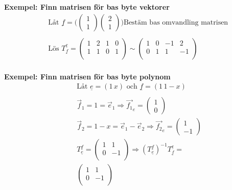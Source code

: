 \textbf{Exempel: Finn matrisen för bas byte vektorer} %
\begin{align*}
  &\quad  \text{Låt } \underline{f} =
  \Big( \begin{pmatrix} 1 \\ 1 \end{pmatrix} \begin{pmatrix} 2 \\ 1 \end{pmatrix} \Big)
  \text{Bestäm bas omvandling matrisen }   \\
  &\quad  \\
  &\quad  \text{Lös } T^{\underline{e}}_{\underline{f}} = 
  \left(\begin{array}{cc|cc}
    1 & 2 & 1 & 0  \\
    1 & 1 & 0 & 1  \\
  \end{array}\right) \sim
    \left(\begin{array}{cc|cc}
    1 & 0 & -1 &  2  \\
    0 & 1 &  1 & -1  \\
  \end{array}\right) \\
\end{align*}

\textbf{Exempel: Finn matrisen för bas byte polynom}
\begin{align*}
  &\quad  \text{Låt } \underline{e}=(1 \, x) \text{ och } \underline{f}=(1 \, 1-x) \\
  &\quad  \\
  &\quad  \vec{f}_1 = 1 = \vec{e}_1 \Rightarrow \vec{f_1}_e = \begin{pmatrix} 1 \\ 0 \end{pmatrix} \\
  &\quad  \vec{f}_2 = 1-x = \vec{e}_1 - \vec{e}_2 \Rightarrow \vec{f_2}_e = \begin{pmatrix} 1 \\ -1 \end{pmatrix} \\
  &\quad  T^{\underline{f}}_{\underline{e}} =
  \left(\begin{array}{cc}
    1 &  1  \\
    0 & -1  \\
  \end{array}\right) \Rightarrow{} {(T^{\underline{f}}_{\underline{e}})}^{-1} T^{\underline{e}}_{\underline{f}} = \\
  &\quad \left(\begin{array}{cc}
    1 &  1  \\
    0 & -1  \\
  \end{array}\right) \text{} \\
\end{align*}


